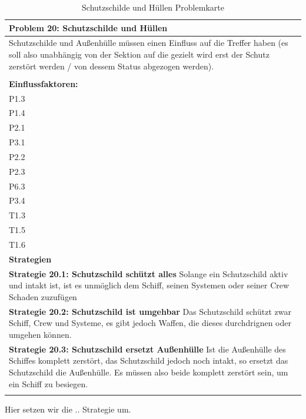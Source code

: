 \documentclass[fontsize=12pt,paper=a4,twoside]{scrartcl}
\begin{document}
\begin{table}[H]
    \centering
    \begin{tabular}{|p{15cm}|}
    \hline
          \textbf{Problem 20: Schutzschilde und Hüllen }  \\ \hline
	Schutzschilde und Außenhülle müssen einen Einfluss auf die Treffer haben (es soll also unabhängig von der Sektion auf die gezielt wird erst der Schutz zerstört werden / von dessem Status abgezogen werden). \\
         \\ \hline
          \textbf{Einflussfaktoren: } \\
	P1.3 \\
	P1.4 \\
	P2.1 \\
	P3.1 \\
	P2.2 \\
	P2.3 \\
	P6.3 \\
	P3.4 \\
	T1.3 \\
	T1.5 \\
	T1.6 \\
          \hline
          \textbf{Strategien} \\ \hline
            {}          
           \label{strategie:20.1}     
          \textbf{Strategie 20.1: Schutzschild schützt alles} Solange ein Schutzschild aktiv und intakt ist, ist es unmöglich dem Schiff, seinen Systemen oder seiner Crew Schaden zuzufügen  \\        
  {}          
           \label{strategie:20.2}              
          \textbf{Strategie 20.2: Schutzschild ist umgehbar} Das Schutzschild schützt zwar Schiff, Crew und Systeme, es gibt jedoch Waffen, die dieses durchdrignen oder umgehen können.  \\
	 {}          
           \label{strategie:20.3}     
          \textbf{Strategie 20.3: Schutzschild ersetzt Außenhülle} Ist die Außenhülle des Schiffes komplett zerstört, das Schutzschild jedoch noch intakt, so ersetzt das Schutzschild die Außenhülle. Es müssen also beide komplett zerstört sein, um ein Schiff zu besiegen.  \\ 
	 \\ \hline
    \end{tabular}

    \caption{Schutzschilde und Hüllen Problemkarte}
    \label{tab:ProblemKarte20}
\end{table}
Hier setzen wir die .. Strategie um. \\
\end{document}
